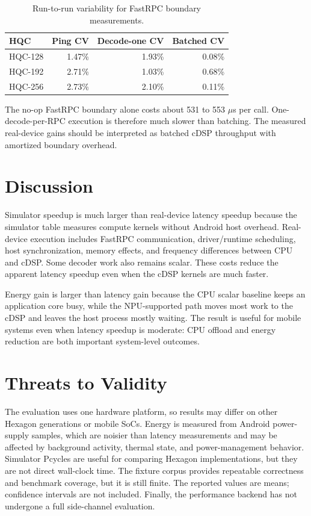 \documentclass[12pt,a4paper]{report}
\begin{document}
\begin{table}[h]
\centering
\caption{Run-to-run variability for FastRPC boundary measurements.}
\label{tab:boundary-cv}
\begin{tabular}{lrrr}
\toprule
HQC & Ping CV & Decode-one CV & Batched CV\\
\midrule
HQC-128 & 1.47\% & 1.93\% & 0.08\%\\
HQC-192 & 2.71\% & 1.03\% & 0.68\%\\
HQC-256 & 2.73\% & 2.10\% & 0.11\%\\
\bottomrule
\end{tabular}
\end{table}

The no-op FastRPC boundary alone costs about 531 to 553 \(\mu\)s per call. One-decode-per-RPC execution is therefore much slower than batching. The measured real-device gains should be interpreted as batched cDSP throughput with amortized boundary overhead.

\section{Discussion}
Simulator speedup is much larger than real-device latency speedup because the simulator table measures compute kernels without Android host overhead. Real-device execution includes FastRPC communication, driver/runtime scheduling, host synchronization, memory effects, and frequency differences between CPU and cDSP. Some decoder work also remains scalar. These costs reduce the apparent latency speedup even when the cDSP kernels are much faster.

Energy gain is larger than latency gain because the CPU scalar baseline keeps an application core busy, while the NPU-supported path moves most work to the cDSP and leaves the host process mostly waiting. The result is useful for mobile systems even when latency speedup is moderate: CPU offload and energy reduction are both important system-level outcomes.

\section{Threats to Validity}
The evaluation uses one hardware platform, so results may differ on other Hexagon generations or mobile SoCs. Energy is measured from Android power-supply samples, which are noisier than latency measurements and may be affected by background activity, thermal state, and power-management behavior. Simulator Pcycles are useful for comparing Hexagon implementations, but they are not direct wall-clock time. The fixture corpus provides repeatable correctness and benchmark coverage, but it is still finite. The reported values are means; confidence intervals are not included. Finally, the performance backend has not undergone a full side-channel evaluation.
\end{document}
